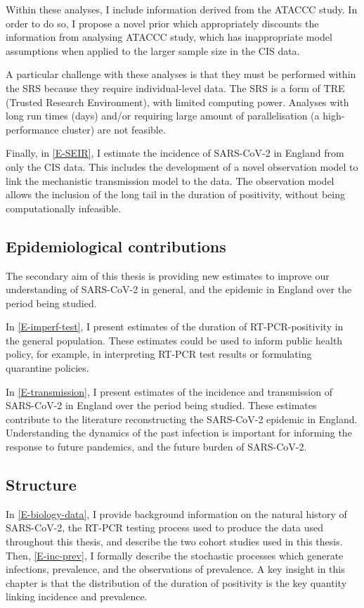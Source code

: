 \documentclass[thesis.tex]{subfiles}
\begin{document}
Within these analyses, I include information derived from the ATACCC study.
In order to do so, I propose a novel prior which appropriately discounts the information from analysing ATACCC study, which has inappropriate model assumptions when applied to the larger sample size in the CIS data.

A particular challenge with these analyses is that they must be performed within the SRS because they require individual-level data.
The SRS is a form of TRE (Trusted Research Environment), with limited computing power.
Analyses with long run times (\ie days) and/or requiring large amount of parallelisation (\eg a high-performance cluster) are not feasible.

Finally, in \cref{E-SEIR}, I estimate the incidence of SARS-CoV-2 in England from only the CIS data.
This includes the development of a novel observation model to link the mechanistic transmission model to the data.
The observation model allows the inclusion of the long tail in the duration of positivity, without being computationally infeasible.

\subsection{Epidemiological contributions}

The secondary aim of this thesis is providing new estimates to improve our understanding of SARS-CoV-2 in general, and the epidemic in England over the period being studied.

In \cref{E-imperf-test}, I present estimates of the duration of RT-PCR-positivity in the general population.
These estimates could be used to inform public health policy, for example, in interpreting RT-PCR test results or formulating quarantine policies.

In \cref{E-transmission}, I present estimates of the incidence and transmission of SARS-CoV-2 in England over the period being studied.
These estimates contribute to the literature reconstructing the SARS-CoV-2 epidemic in England.
Understanding the dynamics of the past infection is important for informing the response to future pandemics, and the future burden of SARS-CoV-2.

\subsection{Structure}

In \cref{E-biology-data}, I provide background information on the natural history of SARS-CoV-2, the RT-PCR testing process used to produce the data used throughout this thesis, and describe the two cohort studies used in this thesis.
Then, \cref{E-inc-prev}, I formally describe the stochastic processes which generate infections, prevalence, and the observations of prevalence.
A key insight in this chapter is that the distribution of the duration of positivity is the key quantity linking incidence and prevalence.
\end{document}
